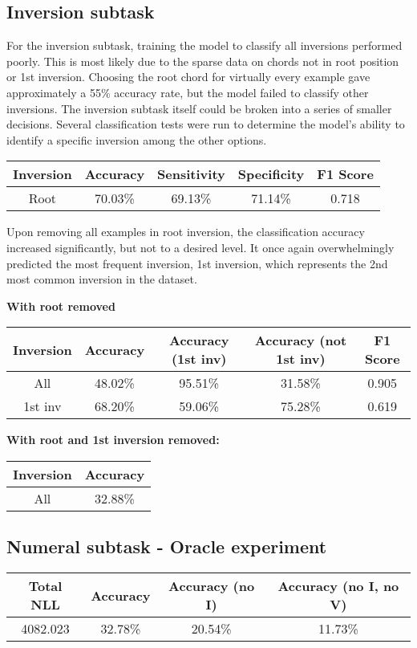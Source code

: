 \documentclass[12pt]{article}
\begin{document}
\subsection{Inversion subtask}

For the inversion subtask, training the model to classify all inversions performed poorly. This is most likely due to the sparse data on chords not in root position or 1st inversion. Choosing the root chord for virtually every example gave approximately a 55\% accuracy rate, but the model failed to classify other inversions. The inversion subtask itself could be broken into a series of smaller decisions. Several classification tests were run to determine the model's ability to identify a specific inversion among the other options. 

\begin{center}
	\begin{tabular}{ c | c | c | c | c }
	\textbf{Inversion} & \textbf{Accuracy} & \textbf{Sensitivity} & \textbf{Specificity} & \textbf{F1 Score} \\ \hline
	Root & 70.03\% & 69.13\% & 71.14\% & 0.718 \\
	\end{tabular}
\end{center}

Upon removing all examples in root inversion, the classification accuracy increased significantly, but not to a desired level. It once again overwhelmingly predicted the most frequent inversion, 1st inversion, which represents the 2nd most common inversion in the dataset.

\begin{center}
	\textbf{With root removed}
	\begin{tabular}{ c | c | c | c | c }
	\textbf{Inversion} & \textbf{Accuracy} & \textbf{Accuracy (1st inv)} & \textbf{Accuracy (not 1st inv)} & \textbf{F1 Score} \\ \hline
	All & 48.02\% & 95.51\% & 31.58\% & 0.905 \\ \hline
	1st inv & 68.20\% & 59.06\% & 75.28\% & 0.619 \\
	\end{tabular}
\end{center}

\begin{center}
	\textbf{With root and 1st inversion removed: }
	\begin{tabular}{ c | c }
	\textbf{Inversion} & \textbf{Accuracy} \\ \hline
	All & 32.88\% \\
	\end{tabular}
\end{center}

\subsection{Numeral subtask - Oracle experiment}

\begin{center}
	\begin{tabular}{ c | c | c | c }
		\textbf{Total NLL} & \textbf{Accuracy} & \textbf{Accuracy (no I)} & \textbf{Accuracy (no I, no V)} \\ \hline
		4082.023 & 32.78\% & 20.54\% & 11.73\%
	\end{tabular}
\end{center}	
\end{document}
